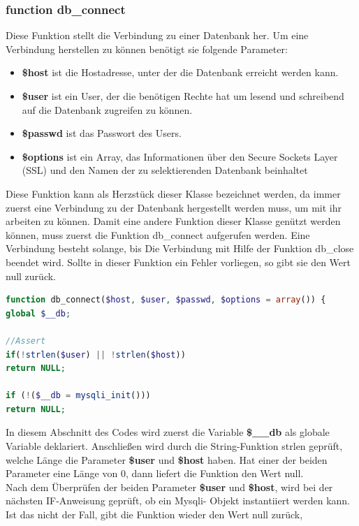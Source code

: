 \subsubsection{function db\_connect}
Diese Funktion stellt die Verbindung zu einer Datenbank her. Um eine Verbindung herstellen zu können benötigt sie folgende Parameter:
	\begin{itemize}
		\item \textbf{\$host} ist die Hostadresse, unter der die Datenbank erreicht werden kann.
		\item \textbf{\$user} ist ein User, der die benötigen Rechte hat um lesend und schreibend auf die Datenbank zugreifen zu können.
		\item \textbf{\$passwd} ist das Passwort des Users.
		\item \textbf{\$options} ist ein Array, das Informationen über den Secure Sockets Layer (SSL) und den Namen der zu selektierenden Datenbank beinhaltet
	\end{itemize}
Diese Funktion kann als Herzstück dieser Klasse bezeichnet werden, da immer zuerst eine Verbindung zu der Datenbank hergestellt werden muss, um mit ihr arbeiten zu können. Damit eine andere Funktion dieser Klasse genützt werden können, muss zuerst die Funktion db\_connect aufgerufen werden.
Eine Verbindung besteht solange, bis Die Verbindung mit Hilfe der Funktion db\_close beendet wird.
Sollte in dieser Funktion ein Fehler vorliegen, so gibt sie den Wert null zurück.
\newpage

\begin{lstlisting}[language=PHP, caption=mysqli.php/function-db\_connect1, firstnumber=21]
function db_connect($host, $user, $passwd, $options = array()) {
global $__db;

//Assert
if(!strlen($user) || !strlen($host))
return NULL;

if (!($__db = mysqli_init()))
return NULL;
\end{lstlisting}

In diesem Abschnitt des Codes wird zuerst die Variable \textbf{\$\_\_db} als globale Variable deklariert. Anschließen wird durch die String-Funktion strlen geprüft, welche Länge die Parameter \textbf{\$user} und \textbf{\$host} haben. Hat einer der beiden Parameter eine Länge von 0, dann liefert die Funktion den Wert null.\\
Nach dem Überprüfen der beiden Parameter \textbf{\$user} und \textbf{\$host}, wird bei der nächsten IF-Anweisung geprüft, ob ein Mysqli- Objekt instantiiert werden kann. Ist das nicht der Fall, gibt die Funktion wieder den Wert null zurück,

